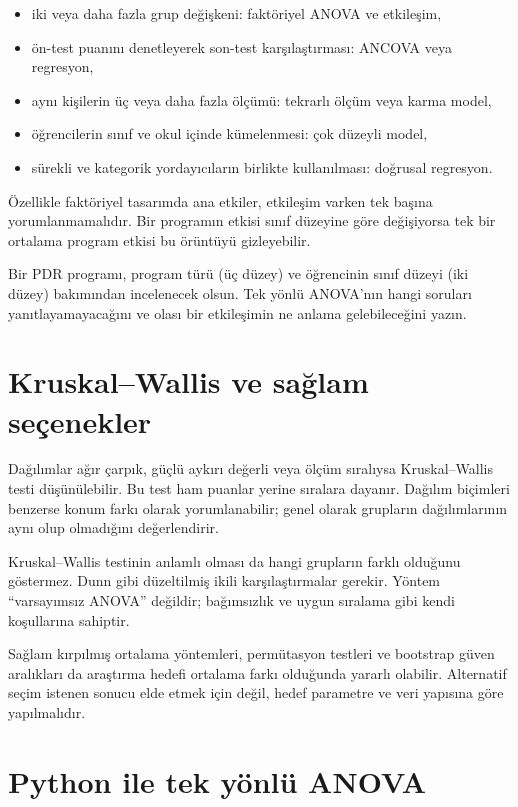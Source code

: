 \begin{itemize}
  \item iki veya daha fazla grup değişkeni: faktöriyel ANOVA ve etkileşim,
  \item ön-test puanını denetleyerek son-test karşılaştırması: ANCOVA veya regresyon,
  \item aynı kişilerin üç veya daha fazla ölçümü: tekrarlı ölçüm veya karma model,
  \item öğrencilerin sınıf ve okul içinde kümelenmesi: çok düzeyli model,
  \item sürekli ve kategorik yordayıcıların birlikte kullanılması: doğrusal regresyon.
\end{itemize}

Özellikle faktöriyel tasarımda ana etkiler, etkileşim varken tek başına
yorumlanmamalıdır. Bir programın etkisi sınıf düzeyine göre değişiyorsa tek bir
ortalama program etkisi bu örüntüyü gizleyebilir.

\begin{etkinlik}
Bir PDR programı, program türü (üç düzey) ve öğrencinin sınıf düzeyi (iki
düzey) bakımından incelenecek olsun. Tek yönlü ANOVA'nın hangi soruları
yanıtlayamayacağını ve olası bir etkileşimin ne anlama gelebileceğini yazın.
\end{etkinlik}

\section{Kruskal--Wallis ve sağlam seçenekler}

Dağılımlar ağır çarpık, güçlü aykırı değerli veya ölçüm sıralıysa
Kruskal--Wallis testi düşünülebilir. Bu test ham puanlar yerine sıralara
dayanır. Dağılım biçimleri benzerse konum farkı olarak yorumlanabilir; genel
olarak grupların dağılımlarının aynı olup olmadığını değerlendirir.

Kruskal--Wallis testinin anlamlı olması da hangi grupların farklı olduğunu
göstermez. Dunn gibi düzeltilmiş ikili karşılaştırmalar gerekir. Yöntem
``varsayımsız ANOVA'' değildir; bağımsızlık ve uygun sıralama gibi kendi
koşullarına sahiptir.

Sağlam kırpılmış ortalama yöntemleri, permütasyon testleri ve bootstrap güven
aralıkları da araştırma hedefi ortalama farkı olduğunda yararlı olabilir.
Alternatif seçim istenen sonucu elde etmek için değil, hedef parametre ve veri
yapısına göre yapılmalıdır.

\section{Python ile tek yönlü ANOVA}

